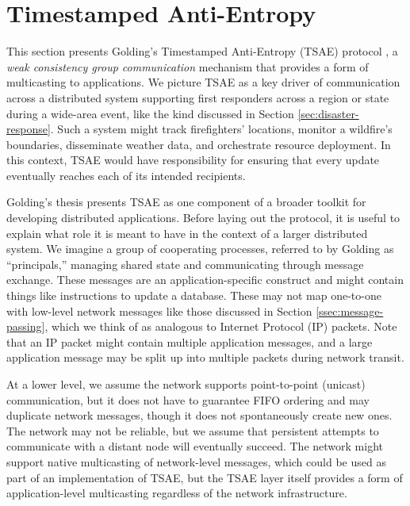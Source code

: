 \documentclass[]             %
{NASA}                       %
\theoremstyle{definition}
\begin{document}
\section{Timestamped Anti-Entropy}
\label{sec:tsae}
This section presents Golding's Timestamped Anti-Entropy (TSAE)
protocol \cite{1992:golding-thesis}, a \emph{weak consistency group
  communication} mechanism that provides a form of multicasting to
applications. We picture TSAE as a key driver of communication across
a distributed system supporting first responders across a region or
state during a wide-area event, like the kind discussed in Section
\ref{sec:disaster-response}. Such a system might track firefighters'
locations, monitor a wildfire's boundaries, disseminate weather data,
and orchestrate resource deployment. In this context, TSAE would have
responsibility for ensuring that every update eventually reaches each
of its intended recipients.

Golding's thesis \cite{1992:golding-thesis} presents TSAE as one
component of a broader toolkit for developing distributed
applications. Before laying out the protocol, it is useful to explain
what role it is meant to have in the context of a larger distributed
system. We imagine a group of cooperating processes, referred to by
Golding as ``principals,'' managing shared state and communicating
through message exchange. These messages are an application-specific
construct and might contain things like instructions to update a
database. These may not map one-to-one with low-level network messages
like those discussed in Section \ref{ssec:message-passing}, which we
think of as analogous to Internet Protocol (IP) packets. Note that an
IP packet might contain multiple application messages, and a large
application message may be split up into multiple packets during
network transit.

At a lower level, we assume the network supports point-to-point
(unicast) communication, but it does not have to guarantee FIFO
ordering and may duplicate network messages, though it does not
spontaneously create new ones. The network may not be reliable, but we
assume that persistent attempts to communicate with a distant node
will eventually succeed. The network might support native multicasting
of network-level messages, which could be used as part of an
implementation of TSAE, but the TSAE layer itself provides a form of
application-level multicasting regardless of the network
infrastructure.
\end{document}
